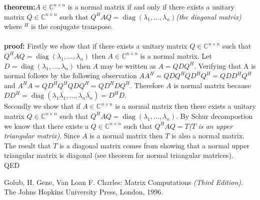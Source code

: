 \documentclass[12pt]{article}
\begin{document}
\textbf{theorem:}$A\in \mathbb{C}^{n\times n}$ is a normal matrix if and only if there exists a unitary matrix $Q \in \mathbb{C}^{n\times n}$ such that $Q^HAQ = \operatorname{diag}(\lambda_1,\ldots , \lambda_n)$\textit{(the diagonal matrix)} where $^H$ is the conjugate transpose. \cite{1}\\\\
\textbf{proof:} Firstly we show that if there exists a unitary matrix $Q \in \mathbb{C}^{n\times n}$ such that $Q^HAQ = \operatorname{diag}(\lambda_1,\ldots , \lambda_n)$ then $A\in \mathbb{C}^{n\times n}$ is a normal matrix.  Let $D = \operatorname{diag}(\lambda_1,\ldots , \lambda_n)$ then $A$ may be written as $A = QDQ^H$.  Verifying that A is normal follows by the following observation $AA^H = QDQ^HQD^HQ^H = QDD^HQ^H$ and $A^HA = QD^HQ^HQDQ^H = QD^HDQ^H$.  Therefore $A$ is normal matrix because $DD^H = \operatorname{diag}(\lambda_1\bar{\lambda_1},\ldots , \lambda_n \bar{\lambda_n}) = D^HD$.\\
Secondly we show that if $A\in \mathbb{C}^{n\times n}$ is a normal matrix then there exists a unitary matrix $Q \in \mathbb{C}^{n\times n}$ such that $Q^HAQ = \operatorname{diag}(\lambda_1,\ldots , \lambda_n)$.  By Schur decompostion we know that there exists a $Q\in \mathbb{C}^{n \times n}$ such that $Q^HAQ=T$\textit{($T$ is an upper triangular matrix)}.  Since $A$ is a normal matrix then $T$ is also a normal matrix.  The result that $T$ is a diagonal matrix comes from showing that a normal upper triangular matrix is diagonal (see theorem for normal triangular matrices).\\
QED
  
\begin{thebibliography}{1}
 Golub, H. Gene, Van Loan F. Charles: Matrix Computations \textit{(Third Edition)}. The Johns Hopkins University Press, London, 1996.
\end{thebibliography}
\end{document}
